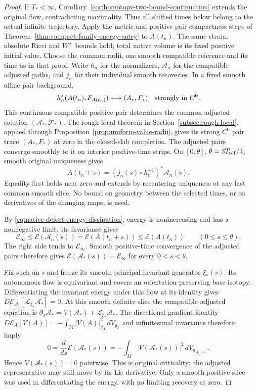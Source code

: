 \documentclass[11pt]{article}
\numberwithin{equation}{section}
\theoremstyle{definition}
\theoremstyle{remark}
\begin{document}
\begin{proof}
If $T_*<\infty$, Corollary~\ref{cor:homotopy-two-bound-continuation}
extends the original flow, contradicting maximality.
Thus all shifted times below belong to the actual infinite
trajectory. Apply the metric and positive pair compactness
steps of Theorem~\ref{thm:compact-family-energy-entry} to
$A(t_n)$. The same strain, absolute Ricci and $W^+$ bounds
hold; total native volume is its fixed positive initial value.
Choose the common radii, one smooth compatible reference
and its time as in that proof. Write $h_n$ for the
normalizers, $\mathcal A_n$ for the compatible adjusted
paths, and $j_n$ for their individual smooth recoveries.
In a fixed smooth affine pair background,
\[
 h_n^*(A(t_n),F_{A(t_n)})\longrightarrow(A_*,F_*)
                         \quad\hbox{strongly in }C^0.
\]
This continuous compatible positive pair determines the
common adjusted solution $(\mathcal A_*,\mathcal F_*)$.
The rough-local theorem in Section~\ref{subsec:rough-local},
applied through Proposition~\ref{prop:uniform-value-radii},
gives its strong $C^0$ pair trace $(A_*,F_*)$ at zero in the
closed-slab completion. The adjusted pairs converge smoothly
to it on interior positive-time strips.
On $[0,\theta]$, $\theta=3T_{\rm ref}/4$, smooth original
uniqueness gives
\[
 A(t_n+s)=(j_n(s)\circ h_n^{-1})^*\mathcal A_n(s).
\]
Equality first holds near zero and extends by recentering
uniqueness at any last common smooth slice. No bound on
geometry between the selected times, or on derivatives of
the changing maps, is used.

By \eqref{eq:native-defect-energy-dissipation}, energy is
nonincreasing and has a nonnegative limit. Its invariance gives
\[
 \mathscr E_\infty\le\mathscr E(\mathcal A_n(s))
    =\mathscr E(A(t_n+s))\le\mathscr E(A(t_n))
           \qquad(0\le s\le\theta).
\]
The right side tends to $\mathscr E_\infty$. Smooth
positive-time convergence of the adjusted pairs therefore
gives $\mathscr E(\mathcal A_*(s))=\mathscr E_\infty$
for every $0<s<\theta$.

Fix such an $s$ and freeze its smooth principal-invariant
generator $\xi_*(s)$. Its autonomous flow is equivariant
and covers an orientation-preserving base isotopy.
Differentiating the invariant energy under this flow at
its identity gives
$D\mathscr E_{\mathcal A_*}[\mathcal L_{\xi_*}\mathcal A_*]=0$.
At this smooth definite slice the compatible adjusted equation
is $\partial_s\mathcal A_*=V(\mathcal A_*)+
\mathcal L_{\xi_*}\mathcal A_*$. The directional gradient identity
$D\mathscr E_A[V(A)]=-\int_M|V(A)|_{g_A}^2\,dV_{g_A}$
and infinitesimal invariance therefore imply
\[
 0=\frac{d}{ds}\mathscr E(\mathcal A_*(s))
    =-\int_M|V(\mathcal A_*(s))|^2\,dV_{g_{\mathcal A_*(s)}}.
\]
Hence $V(\mathcal A_*(s))=0$ pointwise. This is original
criticality; the adjusted representative may still move
by its Lie derivative. Only a smooth positive slice was
used in differentiating the energy, with no limiting
recovery at zero.


\end{proof}
\end{document}
